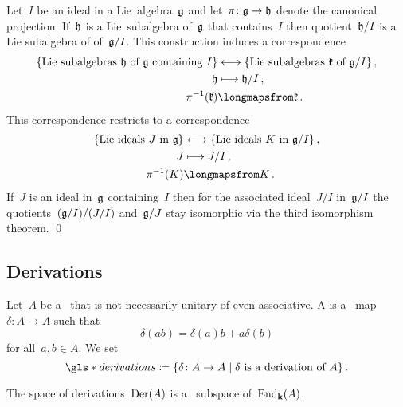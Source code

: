 \begin{proposition}
  \label{correspondence theorem!for Lie algebras}
  Let~$I$ be an ideal in a Lie~algebra~$\mathfrak{g}$ and let~$\pi \colon \mathfrak{g} \to \mathfrak{h}$ denote the canonical projection.
  If~$\mathfrak{h}$ is a Lie~subalgebra of~$\mathfrak{g}$ that contains~$I$ then quotient~$\mathfrak{h}/I$ is a Lie subalgebra of of~$\mathfrak{g}/I$.
  This construction induces a {\onetoone} correspondence
  \begin{align*}
    \{ \text{Lie~subalgebras~$\hlie$ of~$\glie$ containing~$I$} \}
    &\longleftrightarrow
    \{ \text{Lie~subalgebras~$\klie$ of~$\glie/I$} \} \,,
    \\
    \hlie
    &\longmapsto
    \hlie/I \,,
    \\
    \pi^{-1}(\klie)
    &\longmapsfrom
    \klie \,.
  \end{align*}
  This correspondence restricts to a {\onetoone} correspondence
  \begin{align*}
    \{ \text{Lie~ideals~$J$ in~$\glie$} \}
    &\longleftrightarrow
    \{ \text{Lie~ideals~$K$ in~$\glie/I$} \} \,,
    \\
    J
    &\longmapsto
    J/I \,,
    \\
    \pi^{-1}(K)
    &\longmapsfrom
    K \,.
  \end{align*}
  If~$J$ is an ideal in~$\mathfrak{g}$ containing~$I$ then for the associated ideal~$J/I$ in~$\mathfrak{g}/I$ the quotients~$(\mathfrak{g}/I)/(J/I)$ and~$\mathfrak{g}/J$ stay isomorphic via the third isomorphism theorem.
  \qed
\end{proposition}





\subsection{Derivations}


\begin{definition}
  Let~$A$ be a~{\algebra{$\kf$}} that is not necessarily unitary of even associative.
  A  is a~{\linear{$\kf$}} map~$\delta \colon A \to A$ such that
  \[
    \delta(ab)
    =
    \delta(a) b + a \delta(b)
  \]
  for all~$a, b \in A$.
  We set
  \[
    \gls*{derivations}
    \defined
    \{
      \delta
      \colon
      A
      \to
      A
    \suchthat
      \text{$\delta$ is a derivation of~$A$}
    \}  \,.
  \]
\end{definition}


\begin{remark}
  The space of derivations~$\operatorname{Der}(A)$ is a~{\linear{$\kf$}} subspace of~$\operatorname{End}_{\mathbf{k}}(A)$.
\end{remark}



